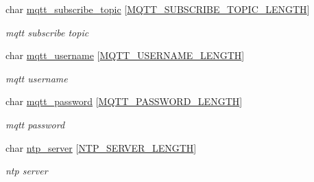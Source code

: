 \begin{DoxyCompactItemize}
\mbox{\label{structconfiguration__t_ae3699c4dd6979713472062bbad82c542}} 
char \hyperlink{structconfiguration__t_ae3699c4dd6979713472062bbad82c542}{mqtt\+\_\+subscribe\+\_\+topic} \mbox{[}\hyperlink{mqtt__config_8h_a2517f6560f7ee99813533e63d7fc91b6}{M\+Q\+T\+T\+\_\+\+S\+U\+B\+S\+C\+R\+I\+B\+E\+\_\+\+T\+O\+P\+I\+C\+\_\+\+L\+E\+N\+G\+TH}\mbox{]}
\begin{DoxyCompactList}\small\item\em mqtt subscribe topic \end{DoxyCompactList}\item 
\mbox{\label{structconfiguration__t_ad97d47b585071f095a97296fc3e260e7}} 
char \hyperlink{structconfiguration__t_ad97d47b585071f095a97296fc3e260e7}{mqtt\+\_\+username} \mbox{[}\hyperlink{mqtt__config_8h_a0e1860b8d036f571ffcb7e6d27832c16}{M\+Q\+T\+T\+\_\+\+U\+S\+E\+R\+N\+A\+M\+E\+\_\+\+L\+E\+N\+G\+TH}\mbox{]}
\begin{DoxyCompactList}\small\item\em mqtt username \end{DoxyCompactList}\item 
\mbox{\label{structconfiguration__t_af842b7c625c3fdfb1b810e24fc1ba1b8}} 
char \hyperlink{structconfiguration__t_af842b7c625c3fdfb1b810e24fc1ba1b8}{mqtt\+\_\+password} \mbox{[}\hyperlink{mqtt__config_8h_a9fa040018ffd349e846cec27b2791fde}{M\+Q\+T\+T\+\_\+\+P\+A\+S\+S\+W\+O\+R\+D\+\_\+\+L\+E\+N\+G\+TH}\mbox{]}
\begin{DoxyCompactList}\small\item\em mqtt password \end{DoxyCompactList}\item 
\mbox{\label{structconfiguration__t_a8de58dc10dfc6b369f34bae82426be5d}} 
char \hyperlink{structconfiguration__t_a8de58dc10dfc6b369f34bae82426be5d}{ntp\+\_\+server} \mbox{[}\hyperlink{ntp__config_8h_a54153a6aa87c606f585ab167661b1be2}{N\+T\+P\+\_\+\+S\+E\+R\+V\+E\+R\+\_\+\+L\+E\+N\+G\+TH}\mbox{]}
\begin{DoxyCompactList}\small\item\em ntp server \end{DoxyCompactList}\item 
\mbox{\label{structconfiguration__t_adede74f3da6d26f5bc4b5e64e4776f7f}} 

\end{DoxyCompactItemize}
